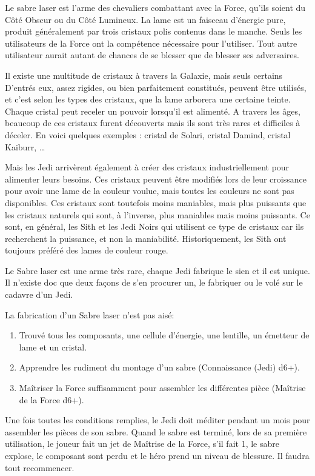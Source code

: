 Le sabre laser est l’arme des chevaliers combattant avec la Force, qu’ils soient du Côté Obscur ou du Côté Lumineux. La lame est un faisceau d’énergie pure, produit généralement par trois cristaux polis contenus dans le manche. Seuls les utilisateurs de la Force ont la compétence nécessaire pour l’utiliser. Tout autre utilisateur aurait autant de chances de se blesser que de blesser ses adversaires. 

Il existe une multitude de cristaux à travers la Galaxie, mais seuls certains D’entrés eux, assez rigides, ou bien parfaitement constitués, peuvent être utilisés, et c’est selon les types des cristaux, que la lame arborera une certaine teinte. Chaque cristal peut receler un pouvoir lorsqu’il est alimenté. A travers les âges, beaucoup de ces cristaux furent découverts mais ils sont très rares et difficiles à déceler. En voici quelques exemples : cristal de Solari, cristal Damind, cristal Kaiburr, \ldots

Mais les Jedi arrivèrent également à créer des cristaux industriellement pour alimenter leurs besoins. Ces cristaux peuvent être modifiés lors de leur croissance pour avoir une lame de la couleur voulue, mais toutes les couleurs ne sont pas disponibles. Ces cristaux sont toutefois moins maniables, mais plus puissants que les cristaux naturels qui sont, à l’inverse, plus maniables mais moins puissants. Ce sont, en général, les Sith et les Jedi Noirs qui utilisent ce type de cristaux car ils recherchent la puissance, et non la maniabilité. Historiquement, les Sith ont toujours préféré des lames de couleur rouge. 

Le Sabre laser est une arme très rare, chaque Jedi fabrique le sien et il est unique. Il n’existe doc que deux façons de s’en procurer un, le fabriquer ou le volé sur le cadavre d’un Jedi.

La fabrication d’un Sabre laser n’est pas aisé:
\begin{enumerate}
	\item Trouvé tous les composants, une cellule d’énergie, une lentille, un émetteur de lame et un cristal.
	\item Apprendre les rudiment du montage d’un sabre (Connaissance (Jedi) d6+).
	\item Maîtriser la Force suffisamment pour assembler les différentes pièce (Maîtrise de la Force d6+).
\end{enumerate}

Une fois toutes les conditions remplies, le Jedi doit méditer pendant un mois pour assembler les pièces de son sabre. Quand le sabre est terminé, lors de sa première utilisation, le joueur fait un jet de Maîtrise de la Force, s’il fait 1, le sabre explose, le composant sont perdu et le héro prend un niveau de blessure. Il faudra tout recommencer.


